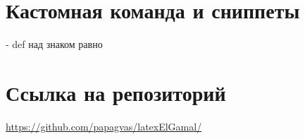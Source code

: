 \documentclass[a4paper,12pt]{report}
\newcommand\myeq{\stackrel{\mathclap{\normalfont\mbox{def}}}{=}}
\begin{document}
\section{Кастомная команда и сниппеты}

\newcommand\myeq{} - def над знаком равно \myeq

\section{Ссылка на репозиторий }

\url{https://github.com/papagvas/latexElGamal/}
\end{document}
